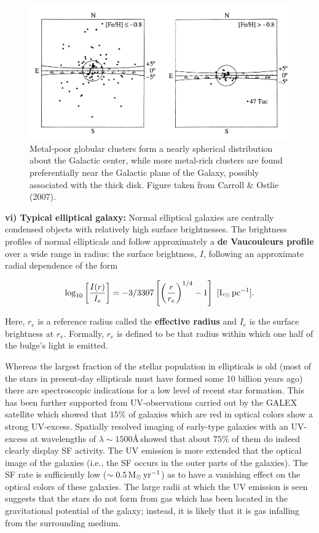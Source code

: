 \documentclass[a4paper,10pt]{article}
\begin{document}
\begin{figure}[t]
    \centering
    \includegraphics[width=14cm]{figures/GlobularClusters_Z.png}
    \caption{\footnotesize{Metal-poor globular clusters form a nearly spherical distribution about the Galactic center, while more metal-rich clusters are found preferentially near the Galactic plane of the Galaxy, possibly associated with the thick disk. Figure taken from Carroll \& Ostlie (2007).}}
    \label{fig:globularclustersz}
\end{figure}

{\noindent}\textbf{vi) Typical elliptical galaxy:} Normal elliptical galaxies are centrally condensed objects with relatively high surface brightnesses. The brightness profiles of normal ellipticals and follow approximately a \textbf{de Vaucouleurs profile} over a wide range in radius: the surface brightness, $I$, following an approximate radial dependence of the form

\begin{align*}
    \log_{10} \left[\frac{I(r)}{I_e}\right] = -3/3307 \left[\left(\frac{r}{r_e}\right)^{1/4} -1\right] ~ [{\rm L_\odot\,pc^{-1}}].
\end{align*}

{\noindent}Here, $r_e$ is a reference radius called the \textbf{effective radius} and $I_e$ is the surface brightness at $r_e$. Formally, $r_e$ is defined to be that radius within which one half of the bulge's light is emitted.

{\noindent}Whereas the largest fraction of the stellar population in ellipticals is old (most of the stars in present-day ellipticals must have formed some 10 billion years ago) there are spectroscopic indications for a low level of recent star formation. This has been further supported from UV-observations carried out by the GALEX satellite which showed that $15\%$ of galaxies which are red in optical colors show a strong UV-excess. Spatially resolved imaging of early-type galaxies with an UV-excess at wavelengths of $\lambda\sim1500$\AA\,showed that about $75\%$ of them do indeed clearly display SF activity. The UV emission is more extended that the optical image of the galaxies (i.e., the SF occurs in the outer parts of the galaxies). The SF rate is sufficiently low ($\sim0.5\,{\rm M_\odot\,yr^{-1}}$) as to have a vanishing effect on the optical colors of these galaxies. The large radii at which the UV emission is seen suggests that the stars do not form from gas which has been located in the gravitational potential of the galaxy; instead, it is likely that it is gas infalling from the surrounding medium.
\end{document}
